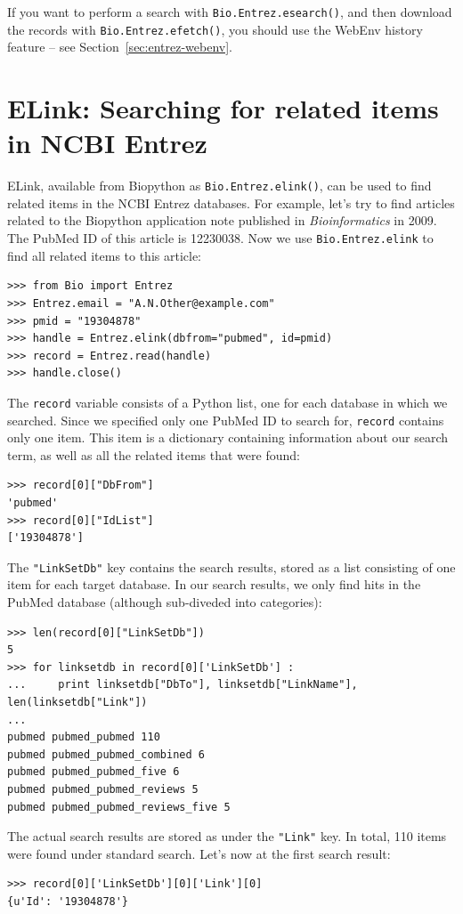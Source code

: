 \documentclass{report}
\begin{document}
If you want to perform a search with \verb|Bio.Entrez.esearch()|, and then download the records with \verb|Bio.Entrez.efetch()|, you should use the WebEnv history feature -- see Section~\ref{sec:entrez-webenv}.

\section{ELink: Searching for related items in NCBI Entrez}

ELink, available from Biopython as \verb+Bio.Entrez.elink()+, can be used to find related items in the NCBI Entrez databases. For example, let's try to find articles related to the Biopython application note published in \textit{Bioinformatics} in 2009. The PubMed ID of this article is 12230038. Now we use \verb+Bio.Entrez.elink+ to find all related items to this article:

\begin{verbatim}
>>> from Bio import Entrez
>>> Entrez.email = "A.N.Other@example.com"
>>> pmid = "19304878"
>>> handle = Entrez.elink(dbfrom="pubmed", id=pmid)
>>> record = Entrez.read(handle)
>>> handle.close()
\end{verbatim}

The \verb+record+ variable consists of a Python list, one for each database in which we searched. Since we specified only one PubMed ID to search for, \verb+record+ contains only one item. This item is a dictionary containing information about our search term, as well as all the related items that were found:

\begin{verbatim}
>>> record[0]["DbFrom"]
'pubmed'
>>> record[0]["IdList"]
['19304878']
\end{verbatim}

The \verb+"LinkSetDb"+ key contains the search results, stored as a list consisting of one item for each target database. In our search results, we only find hits in the PubMed database (although sub-diveded into categories):

\begin{verbatim}
>>> len(record[0]["LinkSetDb"])
5
>>> for linksetdb in record[0]['LinkSetDb'] :
...     print linksetdb["DbTo"], linksetdb["LinkName"], len(linksetdb["Link"])
... 
pubmed pubmed_pubmed 110
pubmed pubmed_pubmed_combined 6
pubmed pubmed_pubmed_five 6
pubmed pubmed_pubmed_reviews 5
pubmed pubmed_pubmed_reviews_five 5
\end{verbatim}

The actual search results are stored as under the \verb+"Link"+ key. In total, 110 items were found under
standard search.
Let's now at the first search result:
\begin{verbatim}
>>> record[0]['LinkSetDb'][0]['Link'][0]
{u'Id': '19304878'}
\end{verbatim}
\end{document}
